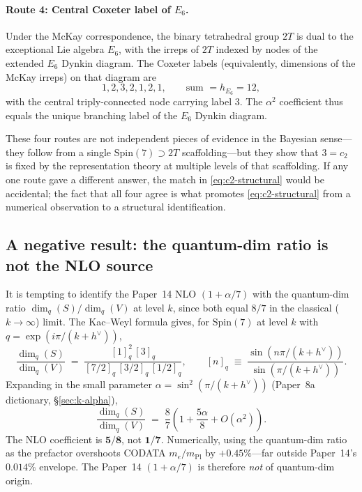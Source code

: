 \documentclass[11pt]{article}
\newcommand{\Spin}{\mathrm{Spin}}
\newcommand{\dimq}{\dim_q}
\newcommand{\mPl}{m_{\mathrm{Pl}}}
\newcommand{\hv}{h^{\vee}}
\begin{document}
\paragraph{Route 4: Central Coxeter label of $E_6$.}
Under the McKay correspondence, the binary tetrahedral group $2T$
is dual to the exceptional Lie algebra $E_6$, with the irreps of
$2T$ indexed by nodes of the extended $E_6$ Dynkin diagram.  The
Coxeter labels (equivalently, dimensions of the McKay irreps) on
that diagram are
\begin{equation}
  1, 2, 3, 2, 1, 2, 1, \qquad
  \text{sum } = h_{E_6} = 12,
\end{equation}
with the central triply-connected node carrying label $3$.  The
$\alpha^2$ coefficient thus equals the unique branching label of
the $E_6$ Dynkin diagram.

\medskip\noindent
These four routes are not independent pieces of evidence in the
Bayesian sense---they follow from a single $\Spin(7) \supset 2T$
scaffolding---but they show that $3 = c_2$ is fixed by the
representation theory at multiple levels of that scaffolding.
If any one route gave a different answer, the match in
\eqref{eq:c2-structural} would be accidental; the fact that all
four agree is what promotes \eqref{eq:c2-structural} from a
numerical observation to a structural identification.

\subsection{A negative result: the quantum-dim ratio is not the NLO source}
\label{sec:alpha-squared-qdim-ruled-out}

It is tempting to identify the Paper~14 NLO
$(1 + \alpha/7)$ with the quantum-dim ratio
$\dimq(S) / \dimq(V)$ at level $k$, since both equal $8/7$ in the
classical ($k \to \infty$) limit.  The Kac--Weyl formula gives,
for $\Spin(7)$ at level $k$ with
$q = \exp(i\pi/(k + \hv))$,
\begin{equation}
  \frac{\dimq(S)}{\dimq(V)}
  \;=\; \frac{[1]_q^2\,[3]_q}{[7/2]_q\,[3/2]_q\,[1/2]_q},
  \qquad
  [n]_q \;\equiv\; \frac{\sin(n\pi/(k+\hv))}{\sin(\pi/(k+\hv))}.
  \label{eq:qdim-ratio}
\end{equation}
Expanding in the small parameter $\alpha = \sin^2(\pi/(k+\hv))$
(Paper~8a dictionary, \S\ref{sec:k-alpha}),
\begin{equation}
  \frac{\dimq(S)}{\dimq(V)}
  \;=\; \frac{8}{7}\left(1 + \frac{5\alpha}{8} + O(\alpha^2)\right).
\end{equation}
The NLO coefficient is $\bm{5/8}$, not $\bm{1/7}$.  Numerically,
using the quantum-dim ratio as the prefactor overshoots
CODATA $m_e/\mPl$ by $+0.45\%$---far outside Paper~14's $0.014\%$
envelope.  The Paper~14 $(1 + \alpha/7)$ is therefore \emph{not}
of quantum-dim origin.
\end{document}
